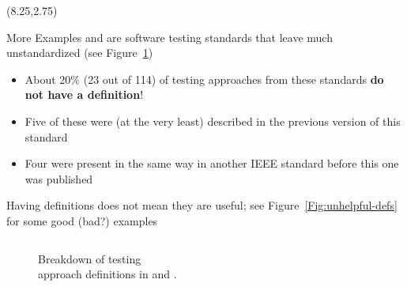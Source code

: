 \documentclass[22pt]{beamer}
\begin{document}
\begin{frame}[fragile]
    \begin{textblock}{7.25}(8.25,2.75)
        \begin{block}{\fontsize{37}{20}\selectfont More Examples}
            \cite{IEEE2022} and \cite{IEEE2021} are software testing
            standards that leave much unstandardized (see Figure~\ref{Fig:IEEEdefs})
            \begin{itemize}
                \item About 20\% (23 out of 114) of testing approaches from
                      these standards \textbf{do not have a definition}!
                \item Five of these were (at the very least) described in the
                      previous version of this standard \cite{IEEE2013}
                \item Four were present in the same way in another IEEE
                      standard \cite{IEEE2017} before this one was published
            \end{itemize}
            \vspace{5mm}
            Having definitions does not mean they are useful; see
            Figure~\ref{Fig:unhelpful-defs} for some good (bad?) examples
            \vspace{-8mm}
            \begin{columns}
                \begin{column}{0.375\textwidth}
                    \begin{center}
                        \begin{figure}
                            \caption{Breakdown of testing\\approach definitions in
                                \cite{IEEE2022} and \cite{IEEE2021}.}
                            \label{Fig:IEEEdefs}
                        \end{figure}
                    \end{center}
                \end{column}
                \begin{column}{0.525\textwidth}

\end{column}
\end{columns}
\end{block}
\end{textblock}
\end{frame}
\end{document}
